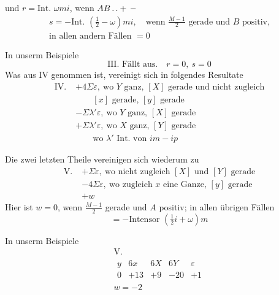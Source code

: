 und $r=\text{Int. }\omega mi$, wenn $AB\mathinner{.\,.}+\,-$
\[
\begin{gathered}
s=-\text{Int. }(\tfrac12-\omega)mi,\quad\text{wenn }\frac{M-1}{2}\text{ gerade und }B\text{ positiv,}\\
\text{in allen andern Fällen }=0
\end{gathered}
\]

In unserm Beispiele
\[
\text{III. Fällt aus.}\quad r=0,\ s=0
\]
Was aus IV genommen ist, vereinigt sich in folgendes Resultate
\[
\begin{aligned}
\mathrm{IV.}\;&+4\Sigma\varepsilon,\ \text{wo }Y\text{ ganz, }[X]\text{ gerade und nicht zugleich}\\
&\qquad[x]\text{ gerade, }[y]\text{ gerade}\\
&-\Sigma\lambda'\varepsilon,\ \text{wo }Y\text{ ganz, }[X]\text{ gerade}\\
&+\Sigma\lambda'\varepsilon,\ \text{wo }X\text{ ganz, }[Y]\text{ gerade}\\
&\qquad\text{wo }\lambda'\text{ Int. von }im-ip
\end{aligned}
\]

Die zwei letzten Theile vereinigen sich wiederum zu
\[
\begin{aligned}
\mathrm{V.}\;&+\Sigma\varepsilon,\ \text{wo nicht zugleich }[X]\text{ und }[Y]\text{ gerade}\\
&-4\Sigma\varepsilon,\ \text{wo zugleich }x\text{ eine Ganze, }[y]\text{ gerade}\\
&+w
\end{aligned}
\]
Hier ist $w=0$, wenn $\frac{M-1}{2}$ gerade und $A$ positiv; in allen übrigen Fällen
\[
=-\text{Intensor }(\tfrac12i+\omega)m
\]

%
In unserm Beispiele
\[
\begin{gathered}
\mathrm{V.}\\
\begin{array}{c|r|r|r|r}
y&6x&6X&6Y&\varepsilon\\
0&+13&+9&-20&+1
\end{array}\\
w=-2
\end{gathered}
\]

